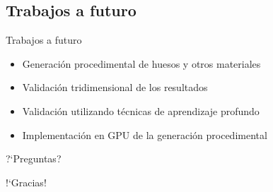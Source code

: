 \documentclass[spanish,unknownkeysallowed]{beamer}
\begin{document}
\subsection{Trabajos a futuro}

\begin{frame}{Trabajos a futuro}
\begin{block}{}
\begin{itemize}
\item Generación procedimental de huesos y otros materiales
\item Validación tridimensional de los resultados
\item Validación utilizando técnicas de aprendizaje profundo
\item Implementación en GPU de la generación procedimental
\end{itemize}
\end{block}
\end{frame}

\begin{frame}
\centering

?`Preguntas?

\end{frame}

\begin{frame}
\centering

!`Gracias!

\end{frame}
\end{document}
